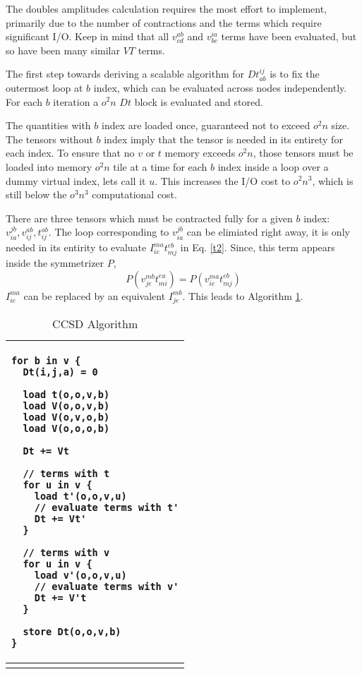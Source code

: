 \documentclass[12pt]{article} \usepackage[margin=1in]{geometry}
\newenvironment{listing}%
               {\begin{table}
                   \begin{tabular}{ p{6in} }
                     \hline}%
               {\end{tabular}%
               \end{table}}
\begin{document}
The doubles amplitudes calculation requires the most effort to
implement, primarily due to the number of contractions and the terms
which require significant I/O.  
Keep in mind that all $v^{ab}_{cd}$ and $v^{ia}_{bc}$ terms have been
evaluated, but so have been many similar $VT$ terms.

The first step towards deriving a scalable
algorithm for $Dt^{ij}_{ab}$ is to fix the outermost loop at $b$
index, which can be evaluated across nodes independently.
For each $b$ iteration a $o^2n$ $Dt$ block is evaluated and stored.

The quantities with $b$ index are loaded once,
guaranteed not to exceed $o^2n$ size.  The tensors without $b$
index imply that the tensor is needed in its entirety for each
index.  To ensure that no $v$ or $t$ memory exceeds $o^2n$, those
 tensors must be loaded into memory $o^2n$ tile at a time
for each $b$ index inside a loop over a dummy virtual index, lets call
it $u$.  This increases the I/O cost to $o^2n^3$, which is still below
the $o^3n^3$ computational cost.

There are three tensors which must be contracted fully for a given $b$
index: $v_{ia}^{jb}, v_{ij}^{ab}, t_{ij}^{ab}$.
The loop corresponding to $v_{ia}^{jb}$ can be elimiated
right away, it is only needed in its entirity to evaluate
$I_{ie}^{ma} t_{mj}^{eb}$ in Eq. \ref{t2}.  Since, this term appears
inside the symmetrizer $P$,
$$P(v_{je}^{mb} t_{mi}^{ea}) = P(v_{ie}^{ma} t_{mj}^{eb})$$
$I_{ie}^{ma}$ can be replaced by an equivalent $I_{je}^{mb}$.
This leads to Algorithm \ref{ccsd}.

\begin {listing}
\begin {verbatim}
for b in v {
  Dt(i,j,a) = 0

  load t(o,o,v,b)
  load V(o,o,v,b)
  load V(o,v,o,b)
  load V(o,o,o,b)

  Dt += Vt

  // terms with t
  for u in v {
    load t'(o,o,v,u)
    // evaluate terms with t'
    Dt += Vt'
  }

  // terms with v
  for u in v {
    load v'(o,o,v,u)
    // evaluate terms with v'
    Dt += V't
  }

  store Dt(o,o,v,b)
}
\end{verbatim} \\
\hline
\caption{CCSD Algorithm}
\label{ccsd}
\end{listing}
\end{document}
